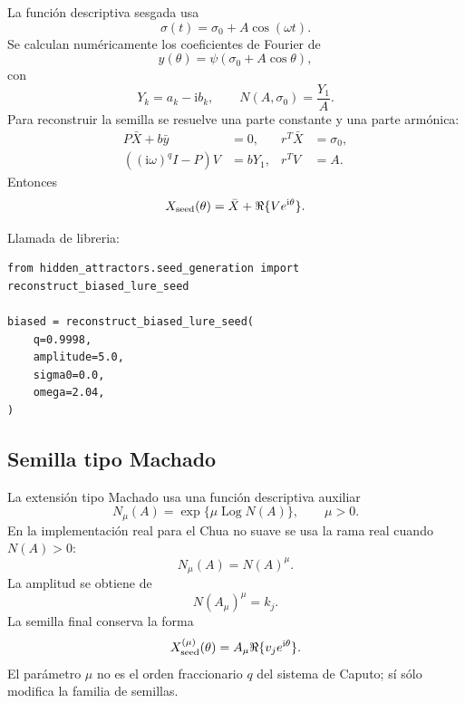 \documentclass[11pt]{article}
\newcommand{\ii}{\mathrm{i}}
\begin{document}
La función descriptiva sesgada usa
\begin{equation}
\sigma(t)=\sigma_0+A\cos(\omega t).
\end{equation}
Se calculan numéricamente los coeficientes de Fourier de
\begin{equation}
 y(\theta)=\psi(\sigma_0+A\cos\theta),
\end{equation}
con
\begin{equation}
Y_k=a_k-\ii b_k,
\qquad
N(A,\sigma_0)=\frac{Y_1}{A}.
\end{equation}
Para reconstruir la semilla se resuelve una parte constante y una parte armónica:
\begin{align}
P\bar X+b\bar y&=0,
& r^T\bar X&=\sigma_0,\\
((\ii\omega)^qI-P)V&=bY_1,
& r^TV&=A.
\end{align}
Entonces
\begin{equation}
X_{\rm seed}(\theta)=\bar X+\Re\{Ve^{\ii\theta}\}.
\end{equation}

Llamada de libreria:
\begin{lstlisting}
from hidden_attractors.seed_generation import reconstruct_biased_lure_seed

biased = reconstruct_biased_lure_seed(
    q=0.9998,
    amplitude=5.0,
    sigma0=0.0,
    omega=2.04,
)
\end{lstlisting}

\subsection{Semilla tipo Machado}

La extensión tipo Machado usa una función descriptiva auxiliar
\begin{equation}
N_\mu(A)=\exp\{\mu\operatorname{Log}N(A)\},
\qquad \mu>0.
\end{equation}
En la implementación real para el Chua no suave se usa la rama real cuando \(N(A)>0\):
\begin{equation}
N_\mu(A)=N(A)^\mu.
\end{equation}
La amplitud se obtiene de
\begin{equation}
N(A_\mu)^\mu=k_j.
\end{equation}
La semilla final conserva la forma
\begin{equation}
X_{\rm seed}^{(\mu)}(\theta)=A_\mu\Re\{v_je^{\ii\theta}\}.
\end{equation}
El parámetro \(\mu\) no es el orden fraccionario \(q\) del sistema de Caputo; sí sólo modifica la familia de semillas.
\end{document}
